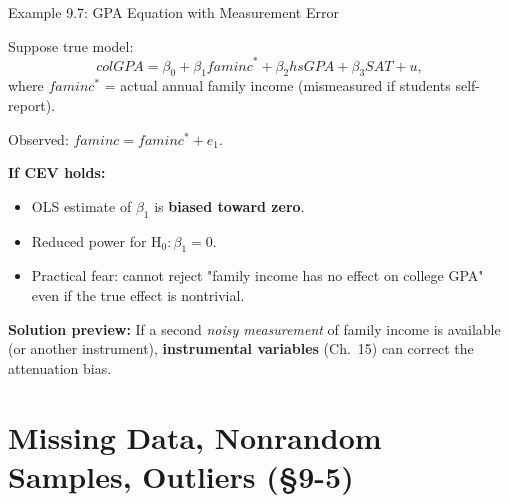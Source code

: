 \documentclass[aspectratio=169, 12pt]{beamer}
\begin{document}
\begin{frame}[shrink=15]{Example 9.7: GPA Equation with Measurement Error}

  Suppose true model:
  \[
    colGPA = \beta_0 + \beta_1 \mathit{faminc}^* + \beta_2 \mathit{hsGPA} + \beta_3 \mathit{SAT} + u,
  \]
  where $faminc^*$ = actual annual family income (mismeasured if students self-report).

  \medskip
  Observed: $faminc = faminc^* + e_1$.

  \begin{keybox}
    \textbf{If CEV holds:}
    \begin{itemize}\setlength{\itemsep}{1pt}
      \item OLS estimate of $\beta_1$ is \textbf{biased toward zero}.
      \item Reduced power for $\text{H}_0: \beta_1 = 0$.
      \item Practical fear: cannot reject "family income has no effect on college GPA"
      even if the true effect is nontrivial.
    \end{itemize}
  \end{keybox}

  \begin{highlightbox}
    \textbf{Solution preview:} If a second \emph{noisy measurement} of family income is
    available (or another instrument), \textbf{instrumental variables} (Ch.~15) can correct
    the attenuation bias.
  \end{highlightbox}

\end{frame}

\section{Missing Data, Nonrandom Samples, Outliers (\S9-5)}
\end{document}
